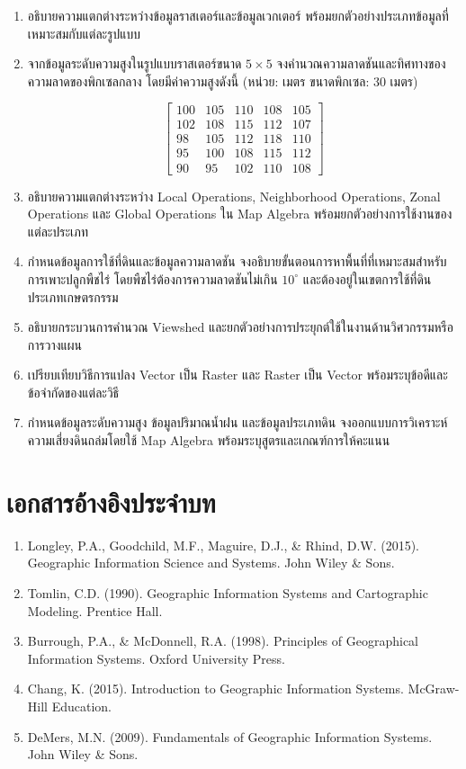 \begin{enumerate}
    \item อธิบายความแตกต่างระหว่างข้อมูลราสเตอร์และข้อมูลเวกเตอร์ พร้อมยกตัวอย่างประเภทข้อมูลที่เหมาะสมกับแต่ละรูปแบบ

    \item จากข้อมูลระดับความสูงในรูปแบบราสเตอร์ขนาด $5 \times 5$ จงคำนวณความลาดชันและทิศทางของความลาดของพิกเซลกลาง โดยมีค่าความสูงดังนี้ (หน่วย: เมตร ขนาดพิกเซล: 30 เมตร)

\[
\begin{bmatrix}
100 & 105 & 110 & 108 & 105 \\
102 & 108 & 115 & 112 & 107 \\
98  & 105 & 112 & 118 & 110 \\
95  & 100 & 108 & 115 & 112 \\
90  & 95  & 102 & 110 & 108
\end{bmatrix}
\]

    \item อธิบายความแตกต่างระหว่าง Local Operations, Neighborhood Operations, Zonal Operations และ Global Operations ใน Map Algebra พร้อมยกตัวอย่างการใช้งานของแต่ละประเภท

    \item กำหนดข้อมูลการใช้ที่ดินและข้อมูลความลาดชัน จงอธิบายขั้นตอนการหาพื้นที่ที่เหมาะสมสำหรับการเพาะปลูกพืชไร่ โดยพืชไร่ต้องการความลาดชันไม่เกิน $10^\circ$ และต้องอยู่ในเขตการใช้ที่ดินประเภทเกษตรกรรม

    \item อธิบายกระบวนการคำนวณ Viewshed และยกตัวอย่างการประยุกต์ใช้ในงานด้านวิศวกรรมหรือการวางแผน

    \item เปรียบเทียบวิธีการแปลง Vector เป็น Raster และ Raster เป็น Vector พร้อมระบุข้อดีและข้อจำกัดของแต่ละวิธี

    \item กำหนดข้อมูลระดับความสูง ข้อมูลปริมาณน้ำฝน และข้อมูลประเภทดิน จงออกแบบการวิเคราะห์ความเสี่ยงดินถล่มโดยใช้ Map Algebra พร้อมระบุสูตรและเกณฑ์การให้คะแนน
\end{enumerate}

\section{เอกสารอ้างอิงประจำบท}

\begin{enumerate}
    \item Longley, P.A., Goodchild, M.F., Maguire, D.J., \& Rhind, D.W. (2015). Geographic Information Science and Systems. John Wiley \& Sons.
    \item Tomlin, C.D. (1990). Geographic Information Systems and Cartographic Modeling. Prentice Hall.
    \item Burrough, P.A., \& McDonnell, R.A. (1998). Principles of Geographical Information Systems. Oxford University Press.
    \item Chang, K. (2015). Introduction to Geographic Information Systems. McGraw-Hill Education.
    \item DeMers, M.N. (2009). Fundamentals of Geographic Information Systems. John Wiley \& Sons.
\end{enumerate}
